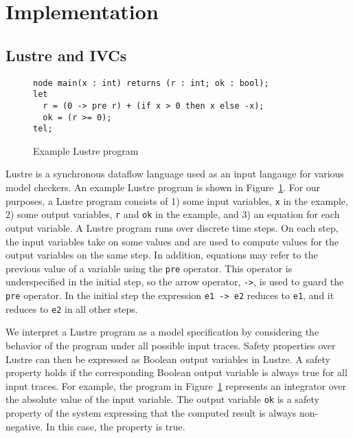 \section{Implementation}
\label{sec:impl}

\subsection{Lustre and IVCs}

\begin{figure}[t]
{\small
\begin{verbatim}
node main(x : int) returns (r : int; ok : bool);
let
  r = (0 -> pre r) + (if x > 0 then x else -x);
  ok = (r >= 0);
tel;
\end{verbatim}
}
  \caption{Example Lustre program}
  \label{fig:lustre-ex}
\end{figure}

Lustre is a synchronous dataflow language used as an input langauge
for various model checkers. An example Lustre program is shown in
Figure~\ref{fig:lustre-ex}. For our purposes, a Lustre program
consists of 1) some input variables, {\tt x} in the example, 2) some
output variables, {\tt r} and {\tt ok} in the example, and 3) an
equation for each output variable. A Lustre program runs over discrete
time steps. On each step, the input variables take on some values and
are used to compute values for the output variables on the same step.
In addition, equations may refer to the previous value of a variable
using the {\tt pre} operator. This operator is underspecified in the
initial step, so the arrow operator, {\tt ->}, is used to guard the
{\tt pre} operator. In the initial step the expression {\tt e1 -> e2}
reduces to {\tt e1}, and it reduces to {\tt e2} in all other steps.

We interpret a Lustre program as a model specification by considering
the behavior of the program under all possible input traces. Safety
properties over Lustre can then be expressed as Boolean output
variables in Lustre. A safety property holds if the corresponding
Boolean output variable is always true for all input traces. For
example, the program in Figure~\ref{fig:lustre-ex} represents an
integrator over the absolute value of the input variable. The output
variable {\tt ok} is a safety property of the system expressing that
the computed result is always non-negative. In this case, the property
is true.

